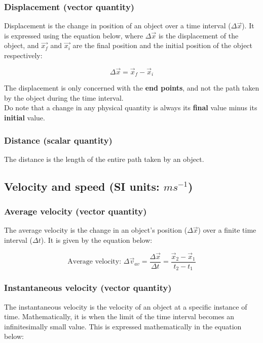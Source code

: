 \documentclass[11pt]{article}
\begin{document}
\subsubsection{Displacement (vector quantity)}
\label{sec:org47f5f14}
Displacement is the change in position of an object over a time interval (\(\Delta \vec{x}\)). It is expressed using the equation below, where \(\Delta \vec{x}\) is the displacement of the object, and \(\vec{x_f}\) and \(\vec{x_i}\) are the final position and the initial position of the object respectively:

\[\Delta \vec{x} = \vec{x}_f - \vec{x}_i\]

The displacement is only concerned with the \textbf{end points}, and not the path taken by the object during the time interval.
\\[0pt]

Do note that a change in any physical quantity is always its \textbf{final} value minus its \textbf{initial} value.

\subsubsection{Distance (scalar quantity)}
\label{sec:org47ed39a}
The distance is the length of the entire path taken by an object.


\subsection{Velocity and speed (SI units: \(\si{ms^{-1}}\))}
\label{sec:orga74b472}

\subsubsection{Average velocity (vector quantity)}
\label{sec:org1fc9df9}
The average velocity is the change in an object's position (\(\Delta \vec{x}\)) over a finite time interval (\(\Delta t\)). It is given by the equation below:

\[\text{Average velocity: } \Delta \vec{v}_{av} = \frac{\Delta \vec{x}}{\Delta t} = \frac{\vec{x}_2 - \vec{x}_1}{t_2 - t_1}\]

\subsubsection{Instantaneous velocity (vector quantity)}
\label{sec:org115e682}
The instantaneous velocity is the velocity of an object at a specific instance of time. Mathematically, it is when the limit of the time interval becomes an infinitesimally small value. This is expressed mathematically in the equation below:
\end{document}
